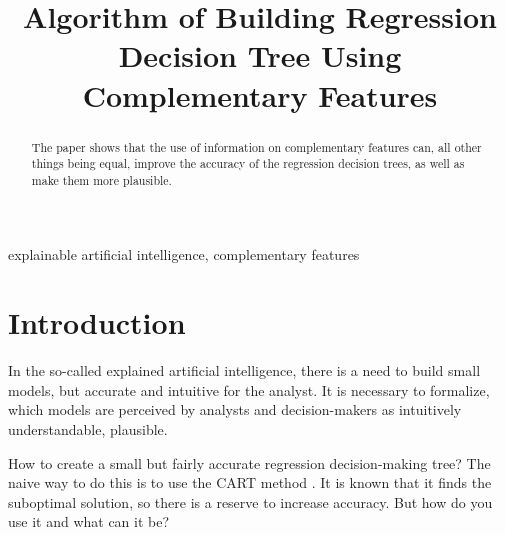 \documentclass[conference]{IEEEtran}
\begin{document}
\title{Algorithm of Building Regression Decision Tree Using Complementary Features \\
}

\author{ %
}

\maketitle
\IEEEoverridecommandlockouts
{} 

\begin{abstract}
The paper shows that the use of information on complementary features can, all other things being equal, improve the accuracy of the regression decision trees, as well as make them more plausible.
\end{abstract}

\begin{IEEEkeywords}
explainable artificial intelligence, complementary features
\end{IEEEkeywords}

\section{Introduction}
In the so-called explained artificial intelligence, there is a need to build small models, but accurate and intuitive for the analyst. It is necessary to formalize, which models are perceived by analysts and decision-makers as intuitively understandable, plausible.


How to create a small but fairly accurate regression decision-making tree? The naive way to do this is to use the CART method \cite{cart}. It is known that it finds the suboptimal solution, so there is a reserve to increase accuracy. But how do you use it and what can it be?
\end{document}

